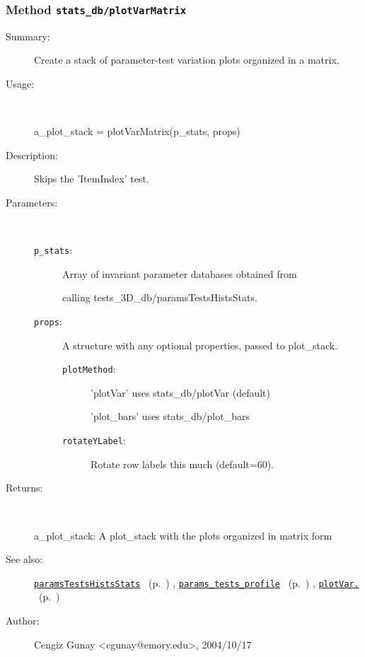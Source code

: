 \subsubsection[Method \texttt{plotVarMatrix}]{Method \texttt{stats\_db/plotVarMatrix}}%
%
\label{ref_stats_db__plotVarMatrix}%
\hypertarget{ref_stats_db__plotVarMatrix}{}%
\begin{description}
\item[Summary:]Create a stack of parameter-test variation plots organized in a matrix.
%
\item[Usage:]~%
\begin{lyxcode}%
a\_plot\_stack = plotVarMatrix(p\_stats, props)
%
\end{lyxcode}%
%
\item[Description:]%
Skips the 'ItemIndex' test.
\item[Parameters:]~
\begin{description}%
\item[\texttt{p\_stats}:]
 Array of invariant parameter databases obtained from

calling tests\_3D\_db/paramsTestsHistsStats.\item[\texttt{props}:]
 A structure with any optional properties, passed to plot\_stack.
\begin{description}%
\item[\texttt{plotMethod}:]
 'plotVar' uses stats\_db/plotVar (default)

'plot\_bars' uses stats\_db/plot\_bars\item[\texttt{rotateYLabel}:]
 Rotate row labels this much (default=60).
\end{description}%
\end{description}%
%
\item[Returns:]~

	a\_plot\_stack: A plot\_stack with the plots organized in matrix form
%
%
\item[See also:]%
\hyperlink{ref_paramsTestsHistsStats}{\texttt{paramsTestsHistsStats}}%
\ (p.~\pageref{ref_paramsTestsHistsStats})%
%
, \hyperlink{ref_params_tests_profile}{\texttt{params\_tests\_profile}}%
\ (p.~\pageref{ref_params_tests_profile})%
%
, \hyperlink{ref_plotVar.}{\texttt{plotVar.}}%
\ (p.~\pageref{ref_plotVar.})%
%
%
\item[Author:]%
Cengiz Gunay <cgunay@emory.edu>, 2004/10/17%
\end{description}
\methodline%
